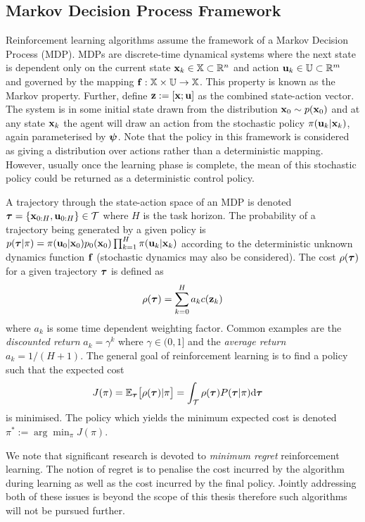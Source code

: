\subsection{Markov Decision Process Framework}
Reinforcement learning algorithms assume the framework of a Markov Decision Process (MDP). MDPs are discrete-time dynamical systems where the next state is dependent only on the current state $\mathbf{x}_k \in \mathbb{X} \subset \mathbb{R}^n$ and action $\mathbf{u}_k \in \mathbb{U} \subset \mathbb{R}^m$ and governed by the mapping $\mathbf{f}: \mathbb{X}\times\mathbb{U}\rightarrow\mathbb{X}$. This property is known as the Markov property. Further, define $\mathbf{z} := [\mathbf{x};\mathbf{u}]$ as the combined state-action vector. The system is in some initial state drawn from the distribution $\mathbf{x}_0 \sim p(\mathbf{x}_0)$ and at any state $\mathbf{x}_k$ the agent will draw an action from the stochastic policy $\pi(\mathbf{u}_k|\mathbf{x}_k)$, again parameterised by $\boldsymbol{\psi}$. Note that the policy in this framework is considered as giving a distribution over actions rather than a deterministic mapping. However, usually once the learning phase is complete, the mean of this stochastic policy could be returned as a deterministic control policy.

A trajectory through the state-action space of an MDP is denoted $\boldsymbol{\tau} = \{\mathbf{x}_{0:H},\mathbf{u}_{0:H}\} \in \mathcal{T}$ where $H$ is the task horizon. The probability of a trajectory being generated by a given policy is $p(\boldsymbol{\tau}|\pi) = \pi(\mathbf{u}_0|\mathbf{x}_0) p_0(\mathbf{x}_0)\prod_{k=1}^H \pi(\mathbf{u}_k|\mathbf{x}_k)$ according to the deterministic unknown dynamics function $\mathbf{f}$ (stochastic dynamics may also be considered). The cost $\rho(\boldsymbol{\tau})$ for a given trajectory $\boldsymbol{\tau}$ is defined as
\begin{equation*}
\rho(\boldsymbol{\tau}) = \sum^H_{k=0} a_kc(\mathbf{z}_k)
\end{equation*}
where $a_k$ is some time dependent weighting factor. Common examples are the \textit{discounted return} $a_k=\gamma^k$ where $\gamma \in (0,1]$ and the \textit{average return} $a_k = 1/(H+1)$. The general goal of reinforcement learning is to find a policy such that the expected cost
\begin{align*}
J(\pi) &= \mathbb{E}_{\boldsymbol{\tau}} \big[\rho(\boldsymbol{\tau}) | \pi \big] = \int_{\mathcal{T}} \rho(\boldsymbol{\tau}) P(\boldsymbol{\tau}|\pi) \mathrm{d} \boldsymbol{\tau}
\end{align*}
is minimised. The policy which yields the minimum expected cost is denoted $\pi^* := \arg\min_\pi J(\pi)$.

We note that significant research is devoted to \textit{minimum regret} reinforcement learning. The notion of regret is to penalise the cost incurred by the algorithm during learning as well as the cost incurred by the final policy. Jointly addressing both of these issues is beyond the scope of this thesis therefore such algorithms will not be pursued further.


